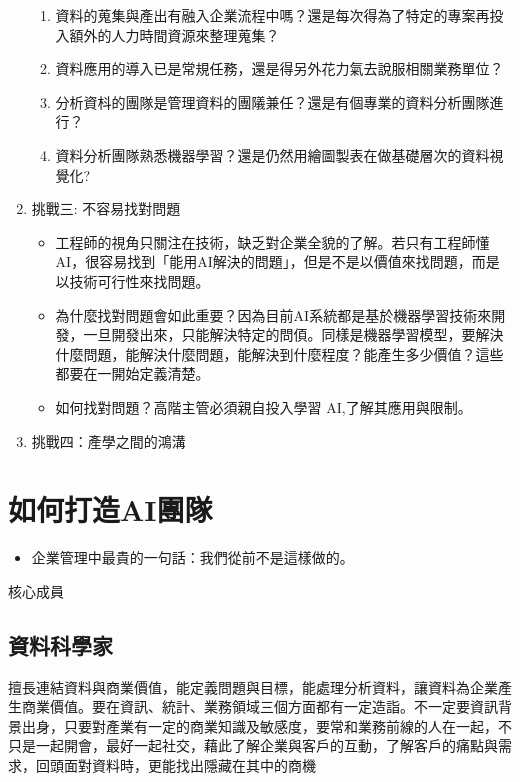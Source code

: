 \documentclass[a4paper,12pt]{article}
\begin{document}
\begin{enumerate}
\begin{enumerate}
\item 資料的蒐集與產出有融入企業流程中嗎？還是每次得為了特定的專案再投入額外的人力時間資源來整理蒐集？\\
\item 資料應用的導入已是常規任務，還是得另外花力氣去說服相關業務單位？\\
\item 分析資枓的團隊是管理資料的團䧧兼任？還是有個專業的資料分析團隊進行？\\
\item 資料分析團隊熟悉機器學習？還是仍然用繪圖製表在做基礎層次的資料視覺化?\\
\end{enumerate}
\item 挑戰三: 不容易找對問題
\label{sec:org024214f}
\begin{itemize}
\item 工程師的視角只關注在技術，缺乏對企業全貌的了解。若只有工程師懂AI，很容易找到「能用AI解決的問題」，但是不是以價值來找問題，而是以技術可行性來找問題。\\
\item 為什麼找對問題會如此重要？因為目前AI系統都是基於機器學習技術來開發，一旦開發出來，只能解決特定的問㑯。同樣是機器學習模型，要解決什麼問題，能解決什麼問題，能解決到什麼程度？能產生多少價值？這些都要在一開始定義清楚。\\
\item 如何找對問題？高階主管必須親自投入學習 AI,了解其應用與限制。\\
\end{itemize}
\item 挑戰四：產學之間的鴻溝
\label{sec:org469b8e6}
\end{enumerate}

\section{如何打造AI團隊}
\label{sec:org442aad9}
\begin{itemize}
\item 企業管理中最貴的一句話：我們從前不是這樣做的。\\
\end{itemize}
核心成員\\
\subsection{資料科學家}
\label{sec:org4500d9c}
擅長連結資料與商業價值，能定義問題與目標，能處理分析資料，讓資料為企業產生商業價值。要在資訊、統計、業務領域三個方面都有一定造詣。不一定要資訊背景出身，只要對產業有一定的商業知識及敏感度，要常和業務前線的人在一起，不只是一起開會，最好一起社交，藉此了解企業與客戶的互動，了解客戶的痛點與需求，回頭面對資料時，更能找出隱藏在其中的商機\\
\end{document}
